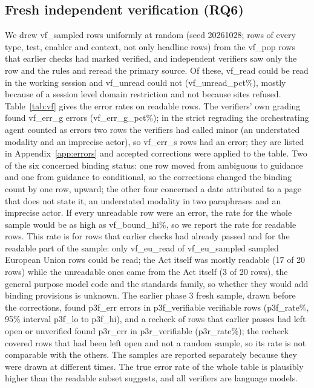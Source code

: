 \documentclass[conference]{IEEEtran}
\begin{document}
\subsection{Fresh independent verification (RQ6)}\label{sec:verify}
We drew {{vf_sampled}} rows uniformly at random (seed 20261028; rows of every type, test, enabler and context, not only headline rows) from the {{vf_pop}} rows that earlier checks had marked verified, and independent verifiers saw only the row and the rules and reread the primary source. Of these, {{vf_read}} could be read in the working session and {{vf_unread}} could not ({{vf_unread_pct}}\%), mostly because of a session level domain restriction and not because sites refused. Table~\ref{tab:vf} gives the error rates on readable rows. The verifiers' own grading found {{vf_err_g}} errors ({{vf_err_g_pct}}\%); in the strict regrading the orchestrating agent counted as errors two rows the verifiers had called minor (an understated modality and an imprecise actor), so {{vf_err_s}} rows had an error; they are listed in Appendix~\ref{app:errors} and accepted corrections were applied to the table. Two of the six concerned binding status: one row moved from ambiguous to guidance and one from guidance to conditional, so the corrections changed the binding count by one row, upward; the other four concerned a date attributed to a page that does not state it, an understated modality in two paraphrases and an imprecise actor. If every unreadable row were an error, the rate for the whole sample would be as high as {{vf_bound_hi}}\%, so we report the rate for readable rows. This rate is for rows that earlier checks had already passed and for the readable part of the sample: only {{vf_eu_read}} of {{vf_eu_sampled}} sampled European Union rows could be read; the Act itself was mostly readable (17 of 20 rows) while the unreadable ones came from the Act itself (3 of 20 rows), the general purpose model code and the standards family, so whether they would add binding provisions is unknown. The earlier phase 3 fresh sample, drawn before the corrections, found {{p3f_err}} errors in {{p3f_verifiable}} verifiable rows ({{p3f_rate}}\%, 95\% interval {{p3f_lo}} to {{p3f_hi}}), and a recheck of rows that earlier passes had left open or unverified found {{p3r_err}} in {{p3r_verifiable}} ({{p3r_rate}}\%); the recheck covered rows that had been left open and not a random sample, so its rate is not comparable with the others. The samples are reported separately because they were drawn at different times. The true error rate of the whole table is plausibly higher than the readable subset suggests, and all verifiers are language models.
\end{document}
